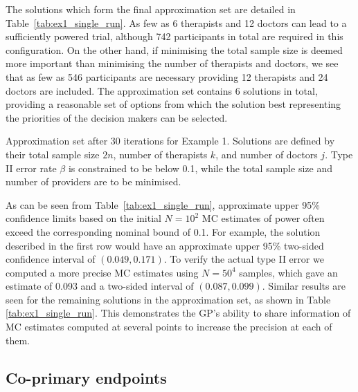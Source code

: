\documentclass{article}
\begin{document}
The solutions which form the final approximation set are detailed in Table~\ref{tab:ex1_single_run}. As few as 6 therapists and 12 doctors can lead to a sufficiently powered trial, although 742 participants in total are required in this configuration. On the other hand, if minimising the total sample size is deemed more important than minimising the number of therapists and doctors, we see that as few as 546 participants are necessary providing 12 therapists and 24 doctors are included. The approximation set contains 6 solutions in total, providing a reasonable set of options from which the solution best representing the priorities of the decision makers can be selected.

\begin{table}
\small\sf\centering
\caption{Approximation set after 30 iterations for Example 1. Solutions are defined by their total sample size $2n$, number of therapists $k$, and number of doctors $j$. Type II error rate $\beta$ is constrained to be below 0.1, while the total sample size and number of providers are to be minimised.}

\label{tab:ex1_single_run}
\end{table}

As can be seen from Table~\ref{tab:ex1_single_run}, approximate upper 95\% confidence limits based on the initial $N = 10^2$ MC estimates of power often exceed the corresponding nominal bound of 0.1. For example, the solution described in the first row would have an approximate upper 95\% two-sided confidence interval of $(0.049, 0.171)$. To verify the actual type II error we computed a more precise MC estimates  using $N = 50^4$ samples, which gave an estimate of 0.093 and a two-sided interval of $(0.087, 0.099)$. Similar results are seen for the remaining solutions in the approximation set, as shown in Table \ref{tab:ex1_single_run}. This demonstrates the GP's ability to share information of MC estimates computed at several points to increase the precision at each of them.


\subsection{Co-primary endpoints}
\end{document}
